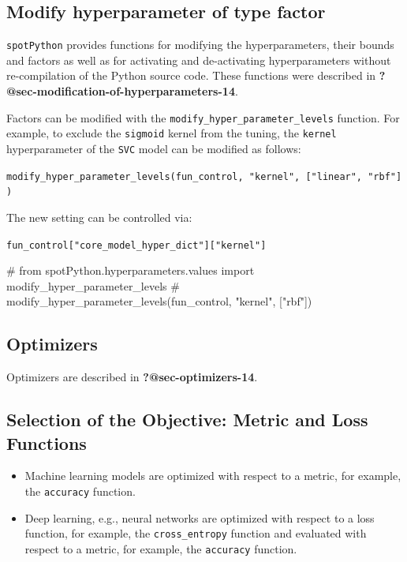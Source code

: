 \documentclass[
  letterpaper,
  DIV=11,
  numbers=noendperiod]{scrreprt}
\newenvironment{Shaded}{\begin{snugshade}}{\end{snugshade}}
\newcommand{\CommentTok}[1]{\textcolor[rgb]{0.37,0.37,0.37}{#1}}
\providecommand{\tightlist}{%
  \setlength{\itemsep}{0pt}\setlength{\parskip}{0pt}}\usepackage{longtable,booktabs,array}
\begin{document}
\hypertarget{modify-hyperparameter-of-type-factor-4}{%
\subsection{Modify hyperparameter of type
factor}\label{modify-hyperparameter-of-type-factor-4}}

\texttt{spotPython} provides functions for modifying the
hyperparameters, their bounds and factors as well as for activating and
de-activating hyperparameters without re-compilation of the Python
source code. These functions were described in
\textbf{?@sec-modification-of-hyperparameters-14}.

Factors can be modified with the
\texttt{modify\_hyper\_parameter\_levels} function. For example, to
exclude the \texttt{sigmoid} kernel from the tuning, the \texttt{kernel}
hyperparameter of the \texttt{SVC} model can be modified as follows:

\texttt{modify\_hyper\_parameter\_levels(fun\_control,\ "kernel",\ {[}"linear",\ "rbf"{]})}

The new setting can be controlled via:

\texttt{fun\_control{[}"core\_model\_hyper\_dict"{]}{[}"kernel"{]}}

\begin{Shaded}
\begin{Highlighting}[]
\CommentTok{\# from spotPython.hyperparameters.values import modify\_hyper\_parameter\_levels}
\CommentTok{\# modify\_hyper\_parameter\_levels(fun\_control, "kernel", ["rbf"])}
\end{Highlighting}
\end{Shaded}

\hypertarget{sec-optimizers-19}{%
\subsection{Optimizers}\label{sec-optimizers-19}}

Optimizers are described in \textbf{?@sec-optimizers-14}.

\hypertarget{selection-of-the-objective-metric-and-loss-functions-3}{%
\subsection{Selection of the Objective: Metric and Loss
Functions}\label{selection-of-the-objective-metric-and-loss-functions-3}}

\begin{itemize}
\tightlist
\item
  Machine learning models are optimized with respect to a metric, for
  example, the \texttt{accuracy} function.
\item
  Deep learning, e.g., neural networks are optimized with respect to a
  loss function, for example, the \texttt{cross\_entropy} function and
  evaluated with respect to a metric, for example, the \texttt{accuracy}
  function.
\end{itemize}
\end{document}
